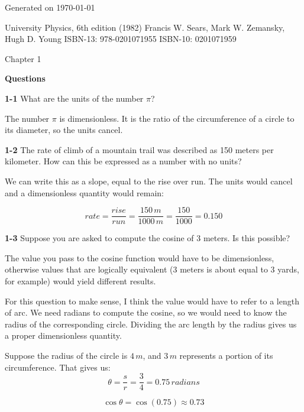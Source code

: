 \documentclass{amsart}
\begin{document}

\begin{flushright}
Generated on \today
\end{flushright}

\begin{flushleft}
University Physics, 6th edition (1982)\newline
Francis W. Sears, Mark W. Zemansky, Hugh D. Young\newline
ISBN-13: 978-0201071955\newline
ISBN-10: 0201071959\newline
\end{flushleft}

Chapter 1

\textbf{Questions}

\textbf{1-1} What are the units of the number $\pi$?

The number $\pi$ is dimensionless.  It is the ratio of the circumference of a circle to its diameter,
so the units cancel.

\textbf{1-2} The rate of climb of a mountain trail was described as 150 meters per kilometer.
How can this be expressed as a number with no units?

We can write this as a slope, equal to the rise over run.
The units would cancel and a dimensionless quantity would remain:

\[
  rate = \frac{rise}{run} = \frac{150 \, m}{1000 \, m} = \frac{150}{1000} = 0.150
\]

\textbf{1-3} Suppose you are asked to compute the cosine of 3 meters. Is this possible?

The value you pass to the cosine function would have to be dimensionless, otherwise values that are logically equivalent
(3 meters is about equal to 3 yards, for example) would yield different results.

For this question to make sense, I think the value would have to refer to a length of arc.
We need radians to compute the cosine, so we would need to know the radius of the corresponding circle.
Dividing the arc length by the radius gives us a proper dimensionless quantity.

Suppose the radius of the circle is $4 \, m$, and $3 \, m$ represents a portion of its circumference.  That gives us:
\[
   \theta = \frac{s}{r} = \frac{3}{4} = 0.75 \, radians
\]

\[
   \cos \theta = \cos(0.75) \approx 0.73
\]
\end{document}
